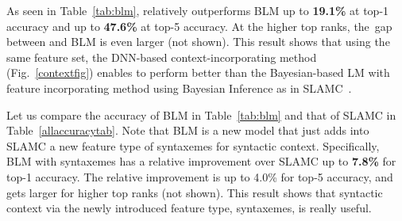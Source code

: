 

\vspace{0.03in}
 As seen in Table~\ref{tab:blm},
{\tool} relatively outperforms BLM up to {\bf 19.1\%}
at top-1 accuracy and up to {\bf 47.6\%}
at top-5 accuracy. At the higher top ranks, the~gap between
{\tool} and BLM is even larger (not shown). This result shows that
using the same feature set,
the DNN-based context-incorporating method
(Fig.~\ref{contextfig}) enables {\tool} to perform better
than the Bayesian-based LM with feature incorporating method using
Bayesian Inference 
as in SLAMC~\cite{fse13}.

Let us compare the accuracy of BLM in Table~\ref{tab:blm} and that of
SLAMC in Table~\ref{allaccuracytab}. Note that BLM is a new model that
just adds into SLAMC a new feature type of syntaxemes for syntactic
context. Specifically, BLM with syntaxemes has a relative improvement
over SLAMC up to {\bf 7.8\%}
for top-1 accuracy. The relative improvement is up to 4.0\%
for top-5 accuracy, and gets larger for higher top ranks (not
shown). This result shows that syntactic context via the newly
introduced feature type, syntaxemes, is really useful.

